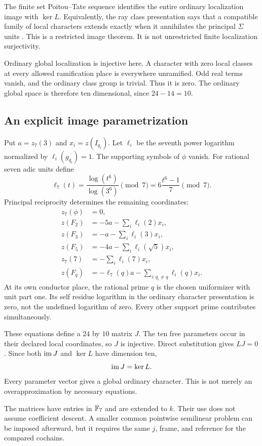 The finite set Poitou--Tate sequence identifies the entire ordinary localization image with $\ker L$. Equivalently, the ray class presentation says that a compatible family of local characters extends exactly when it annihilates the principal $\Sigma$ units \cite{milneADT2006,milneCFT2020}. This is a restricted image theorem. It is not unrestricted finite localization surjectivity.

Ordinary global localization is injective here. A character with zero local classes at every allowed ramification place is everywhere unramified. Odd real terms vanish, and the ordinary class group is trivial. Thus it is zero. The ordinary global space is therefore ten dimensional, since $24-14=10$.

\subsection{An explicit image parametrization}
Put $a=z_7(3)$ and $x_i=z(I_{q_i})$. Let $\ell_i$ be the seventh power logarithm normalized by $\ell_i(g_{q_i})=1$. The supporting symbols of $\phi$ vanish. For rational seven adic units define
\[
\ell_7(t)=\frac{\log(t^6)}{\log(3^6)}\pmod7
=6\frac{t^6-1}{7}\pmod7.
\]
Principal reciprocity determines the remaining coordinates:
\begin{align}
z_7(\phi)&=0,\label{eq:Jphi}\\
z(F_2)&=-5a-\sum_i\ell_i(2)x_i,\label{eq:J2}\\
z(F_3)&=-a-\sum_i\ell_i(3)x_i,\label{eq:J3}\\
z(F_5)&=-4a-\sum_i\ell_i(\sqrt5)x_i,\label{eq:J5}\\
z_7(7)&=-\sum_i\ell_i(7)x_i,\label{eq:J7}\\
z(F_q)&=-\ell_7(q)a-\sum_{i:q_i\ne q}\ell_i(q)x_i.\label{eq:Jq}
\end{align}
At its own conductor place, the rational prime $q$ is the chosen uniformizer with unit part one. Its self residue logarithm in the ordinary character presentation is zero, not the undefined logarithm of zero. Every other support prime contributes simultaneously.

These equations define a $24$ by $10$ matrix $J$. The ten free parameters occur in their declared local coordinates, so $J$ is injective. Direct substitution gives $LJ=0$. Since both $\operatorname{im} J$ and $\ker L$ have dimension ten,
\begin{equation}\label{eq:Jcomplete}
\operatorname{im} J=\ker L.
\end{equation}
Every parameter vector gives a global ordinary character. This is not merely an overapproximation by necessary equations.

The matrices have entries in $\mathbb F_7$ and are extended to $k$. Their use does not assume coefficient descent. A smaller common pointwise semilinear problem can be imposed afterward, but it requires the same $j$, frame, and reference for the compared cochains.
